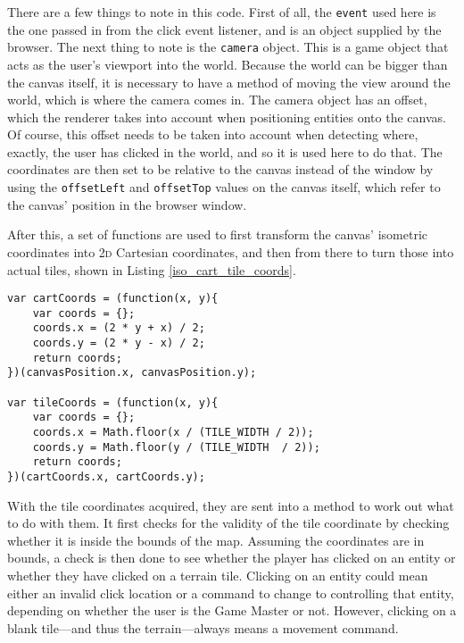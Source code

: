 There are a few things to note in this code. First of all, the \texttt{event} used here is the one passed in from the click event listener, and is an object supplied by the browser. The next thing to note is the \texttt{camera} object. This is a game object that acts as the user's viewport into the world. Because the world can be bigger than the canvas itself, it is necessary to have a method of moving the view around the world, which is where the camera comes in. The camera object has an offset, which the renderer takes into account when positioning entities onto the canvas. Of course, this offset needs to be taken into account when detecting where, exactly, the user has clicked in the world, and so it is used here to do that. The coordinates are then set to be relative to the canvas instead of the window by using the \texttt{offsetLeft} and \texttt{offsetTop} values on the canvas itself, which refer to the canvas' position in the browser window.

After this, a set of functions are used to first transform the canvas' isometric coordinates into \textsc{2d} Cartesian coordinates, and then from there to turn those into actual tiles, shown in Listing \ref{iso_cart_tile_coords}.

\noindent
\begin{minipage}{\linewidth}
\begin{lstlisting}[style=js, caption={Turning the canvas isometric coordinates into \textsc{2d} Cartesian coordinates and then into tile positions. Original algorithm to transform isometric to Cartesian space from \cite{citeulike:13155325}.}, label=iso_cart_tile_coords]
var cartCoords = (function(x, y){
    var coords = {};
    coords.x = (2 * y + x) / 2;
    coords.y = (2 * y - x) / 2;
    return coords;
})(canvasPosition.x, canvasPosition.y);

var tileCoords = (function(x, y){
    var coords = {};
    coords.x = Math.floor(x / (TILE_WIDTH / 2));
    coords.y = Math.floor(y / (TILE_WIDTH  / 2));
    return coords;
})(cartCoords.x, cartCoords.y);
\end{lstlisting}
\end{minipage}

With the tile coordinates acquired, they are sent into a method to work out what to do with them. It first checks for the validity of the tile coordinate by checking whether it is inside the bounds of the map. Assuming the coordinates are in bounds, a check is then done to see whether the player has clicked on an entity or whether they have clicked on a terrain tile. Clicking on an entity could mean either an invalid click location or a command to change to controlling that entity, depending on whether the user is the Game Master or not. However, clicking on a blank tile---and thus the terrain---always means a movement command.

